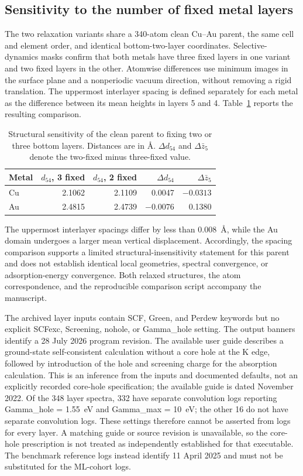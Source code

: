 \documentclass[11pt,a4paper]{article}
\begin{document}
\subsection{Sensitivity to the number of fixed metal layers}
The two relaxation variants share a 340-atom clean Cu--Au parent, the same cell and element order, and identical bottom-two-layer coordinates. Selective-dynamics masks confirm that both metals have three fixed layers in one variant and two fixed layers in the other. Atomwise differences use minimum images in the surface plane and a nonperiodic vacuum direction, without removing a rigid translation. The uppermost interlayer spacing is defined separately for each metal as the difference between its mean heights in layers 5 and 4. Table~\ref{tab:fixedlayers} reports the resulting comparison.
\begin{table}[H]\centering
\caption{Structural sensitivity of the clean parent to fixing two or three bottom layers. Distances are in \AA{}. $\Delta d_{54}$ and $\Delta\bar z_5$ denote the two-fixed minus three-fixed value.}\label{tab:fixedlayers}
\begin{tabular}{@{}lrrrr@{}}\toprule
Metal & $d_{54}$, 3 fixed & $d_{54}$, 2 fixed & $\Delta d_{54}$ & $\Delta\bar z_5$\\\midrule
Cu & 2.1062 & 2.1109 & 0.0047 & $-0.0313$\\
Au & 2.4815 & 2.4739 & $-0.0076$ & 0.1380\\\bottomrule
\end{tabular}
\end{table}
The uppermost interlayer spacings differ by less than 0.008~\AA{}, while the Au domain undergoes a larger mean vertical displacement. Accordingly, the spacing comparison supports a limited structural-insensitivity statement for this parent and does not establish identical local geometries, spectral convergence, or adsorption-energy convergence. Both relaxed structures, the atom correspondence, and the reproducible comparison script accompany the manuscript.

The archived layer inputs contain SCF, Green, and Perdew keywords but no explicit SCFexc, Screening, nohole, or Gamma\_hole setting. The output banners identify a 28 July 2026 program revision. The available user guide describes a ground-state self-consistent calculation without a core hole at the K edge, followed by introduction of the hole and screening charge for the absorption calculation.\cite{fdmnesmanual} This is an inference from the inputs and documented defaults, not an explicitly recorded core-hole specification; the available guide is dated November 2022. Of the 348 layer spectra, 332 have separate convolution logs reporting Gamma\_hole = 1.55~eV and Gamma\_max = 10~eV; the other 16 do not have separate convolution logs. These settings therefore cannot be asserted from logs for every layer. A matching guide or source revision is unavailable, so the core-hole prescription is not treated as independently established for that executable. The benchmark reference logs instead identify 11 April 2025 and must not be substituted for the ML-cohort logs.
\end{document}

